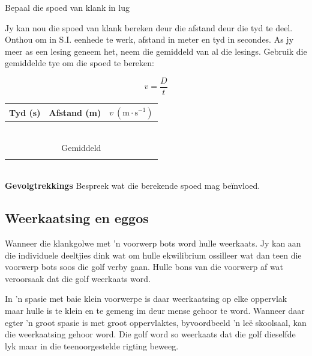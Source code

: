 \begin{i_experiment}{Bepaal die spoed van klank in lug}
\begin{minipage}{.45\textwidth}
Jy kan nou die spoed van klank bereken deur die afstand deur die tyd te deel. Onthou om in S.I. eenhede te werk, afstand in meter en tyd in secondes. As jy meer as een lesing geneem het, neem die gemiddeld van al die lesings. Gebruik die gemiddelde tye om die spoed te bereken: 

\begin{equation*}
 v = \frac{D}{t}
\end{equation*}
\end{minipage}\hspace{.03\textwidth}
\begin{minipage}{.5\textwidth}
\begin{table}[H]
 \begin{tabular}{|c|c|c|}\hline\hline
Tyd (s) & Afstand (m) & $v~(\text{m}\cdot\text{s}^{-1})$ \\\hline
 & & \\\hline 
 & & \\\hline 
 & & \\\hline 
 & & \\\hline 
 & & \\\hline 
 & & \\\hline \hline
\multicolumn{3}{|c|}{Gemiddeld} \\ \hline
 & & \\\hline 
 \end{tabular}
\end{table}
\end{minipage}\\
\textbf{Gevolgtrekkings}
Bespreek wat die berekende spoed mag be\"{i}nvloed.
\end{i_experiment}

\subsection{Weerkaatsing en eggos}

Wanneer die klankgolwe met  'n voorwerp bots word hulle weerkaats. Jy kan aan die individuele deeltjies dink wat om hulle ekwilibrium ossilleer wat dan teen die voorwerp bots soos die golf verby gaan. Hulle bons van die voorwerp af wat veroorsaak dat die golf weerkaats word.

In  'n spasie met baie klein voorwerpe is daar weerkaatsing op elke oppervlak maar hulle is te klein en te gemeng im deur mense gehoor te word. Wanneer daar egter  'n groot spasie is met groot oppervlaktes, byvoordbeeld  'n le\"e skoolsaal, kan die weerkaatsing gehoor word. Die golf word so weerkaats dat die golf dieselfde lyk maar in die teenoorgestelde rigting beweeg.

